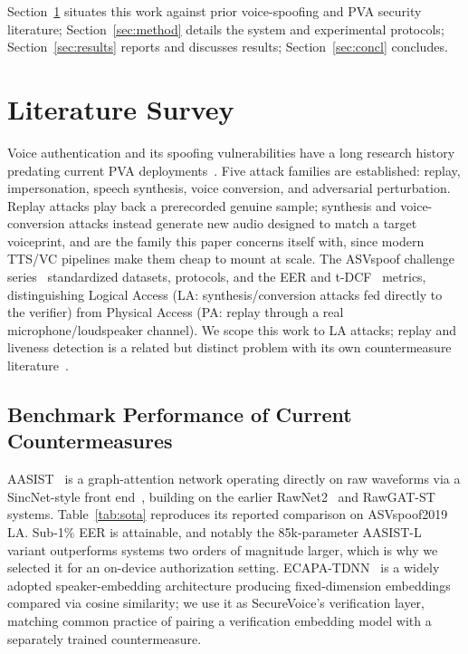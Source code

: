 \documentclass[conference]{IEEEtran}
\begin{document}
Section~\ref{sec:lit} situates this work against prior voice-spoofing and PVA
security literature; Section~\ref{sec:method} details the system and
experimental protocols; Section~\ref{sec:results} reports and discusses
results; Section~\ref{sec:concl} concludes.

\section{Literature Survey}\label{sec:lit}

Voice authentication and its spoofing vulnerabilities have a long research
history predating current PVA deployments~\cite{cheng2022survey,wu2015survey}.
Five attack families are established: replay, impersonation, speech synthesis,
voice conversion, and adversarial perturbation. Replay attacks play back a
prerecorded genuine sample; synthesis and voice-conversion attacks instead
generate new audio designed to match a target voiceprint, and are the family
this paper concerns itself with, since modern TTS/VC pipelines make them cheap
to mount at scale. The ASVspoof challenge
series~\cite{todisco2019asvspoof,nautsch2021asvspoof,yamagishi2021asvspoof}
standardized datasets, protocols, and the EER and t-DCF~\cite{kinnunen2018tdcf}
metrics, distinguishing Logical Access (LA: synthesis/conversion attacks fed
directly to the verifier) from Physical Access (PA: replay through a real
microphone/loudspeaker channel). We scope this work to LA attacks; replay and
liveness detection is a related but distinct problem with its own countermeasure
literature~\cite{blue2018hello,zhang2016voicelive}.

\subsection{Benchmark Performance of Current Countermeasures}

AASIST~\cite{jung2022aasist} is a graph-attention network operating directly on
raw waveforms via a SincNet-style front end~\cite{ravanelli2018sincnet},
building on the earlier RawNet2~\cite{tak2021rawnet2} and
RawGAT-ST~\cite{tak2021rawgat} systems. Table~\ref{tab:sota} reproduces its
reported comparison on ASVspoof2019 LA. Sub-1\% EER is attainable, and notably
the 85k-parameter AASIST-L variant outperforms systems two orders of magnitude
larger, which is why we selected it for an on-device authorization setting.
ECAPA-TDNN~\cite{desplanques2020ecapa} is a widely adopted speaker-embedding
architecture producing fixed-dimension embeddings compared via cosine
similarity; we use it as SecureVoice's verification layer, matching common
practice of pairing a verification embedding model with a separately trained
countermeasure.
\end{document}
